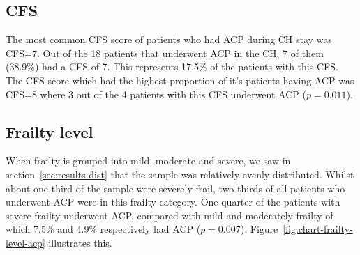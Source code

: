 \documentclass
[
	12pt,
	a4paper,
	oneside,
]{report}
\begin{document}
\subsection{CFS}

The most common CFS score of patients 
who had ACP during CH stay was CFS=7. Out of the 18 patients that
underwent ACP in the CH, 7 of them (38.9\%) had a CFS of 7. This represents 
17.5\% of the patients with this CFS. The CFS score which had the highest 
proportion of it's patients having ACP was CFS=8 where 3 out of the 4 patients 
with this CFS underwent ACP ($p=0.011$). 


\subsection{Frailty level}

When frailty is grouped into mild, moderate and severe, we saw in 
scetion~\ref{sec:results-dist} that the
sample was relatively evenly distributed. 
Whilst about one-third of the sample were severely frail, two-thirds of all 
patients who underwent ACP were in this frailty category. One-quarter of
the patients with severe frailty underwent ACP, compared with mild and moderately
frailty of which 7.5\% and 4.9\% respectively had ACP ($p=0.007$).
Figure~\ref{fig:chart-frailty-level-acp} illustrates this.
\end{document}
